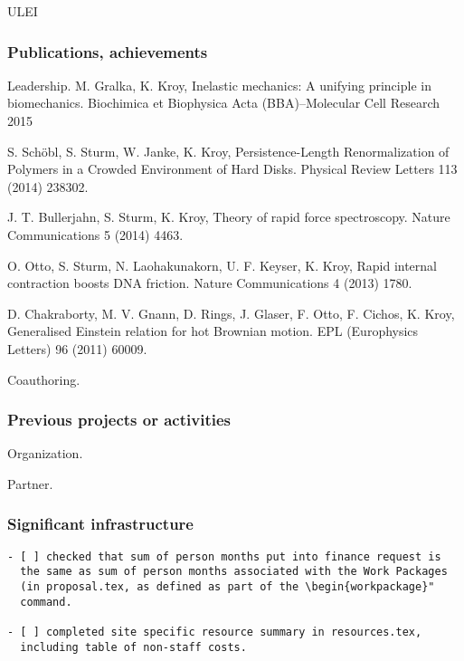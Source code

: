 \begin{sitedescription}{ULEI}
\subsubsection*{Publications, achievements}

\begin{compactenum}
\item Leadership.
M. Gralka, K. Kroy, Inelastic mechanics: A unifying principle in biomechanics. 
Biochimica et Biophysica Acta (BBA)--Molecular Cell Research 2015

S. Schöbl, S. Sturm, W. Janke, K. Kroy, Persistence-Length Renormalization of Polymers in a Crowded Environment of Hard Disks.
Physical Review Letters 113 (2014) 238302.

J. T. Bullerjahn, S. Sturm, K. Kroy, Theory of rapid force spectroscopy. Nature Communications 5 (2014) 4463.

O. Otto, S. Sturm, N. Laohakunakorn, U. F. Keyser, K. Kroy, Rapid internal contraction boosts DNA friction.
Nature Communications 4 (2013) 1780.

D. Chakraborty, M. V. Gnann, D. Rings, J. Glaser, F. Otto, F. Cichos, K. Kroy, 
Generalised Einstein relation for hot Brownian motion. EPL (Europhysics Letters) 96 (2011) 60009.

\item Coauthoring.
\end{compactenum}

\subsubsection*{Previous projects or activities}

\begin{compactenum}
\item Organization.
\item Partner.
\end{compactenum}

\subsubsection*{Significant infrastructure}


\end{sitedescription}

\begin{draft}
\vspace{1cm}

\begin{verbatim}
- [ ] checked that sum of person months put into finance request is
  the same as sum of person months associated with the Work Packages
  (in proposal.tex, as defined as part of the \begin{workpackage}"
  command.
  
- [ ] completed site specific resource summary in resources.tex,
  including table of non-staff costs.

\end{verbatim}
\end{draft}

